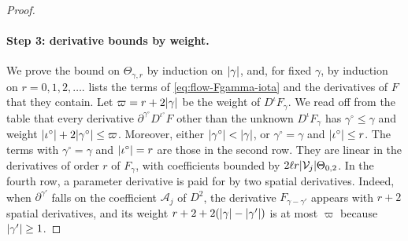 \begin{proof}
\paragraph{Step 3: derivative bounds by weight.} We prove the bound on
$\Theta_{\gamma,r}$ by induction on $\lvert \gamma\rvert$, and, for fixed $\gamma$, by
induction on $r=0,1,2,\dots$.  lists the terms of
\eqref{eq:flow-Fgamma-iota} and the derivatives of $F$ that they contain. Let
$\varpi=r+2\lvert \gamma\rvert$ be the weight of $D^\iota F_\gamma$. We read off from the
table that every derivative $\partial^{\gamma^\circ}D^{\iota^\circ}F$ other than
the unknown $D^\iota F_\gamma$ has $\gamma^\circ\le\gamma$ and weight
$\lvert \iota^\circ\rvert+2\lvert \gamma^\circ\rvert\le\varpi$. Moreover, either
$\lvert \gamma^\circ\rvert<\lvert \gamma\rvert$, or $\gamma^\circ=\gamma$ and $\lvert \iota^\circ\rvert\le r$.
The terms with $\gamma^\circ=\gamma$ and $\lvert \iota^\circ\rvert=r$ are those in the
second row. They are linear in the derivatives of order $r$ of $F_\gamma$, with
coefficients bounded by $2\ell r\lvert \mathcal V_j\rvert\Theta_{0,2}$. In the fourth
row, a parameter derivative is paid for by two spatial derivatives. Indeed, when
$\partial^{\gamma'}$ falls on the coefficient $\mathcal A_j$ of $D^2$, the
derivative $F_{\gamma-\gamma'}$ appears with $r+2$ spatial derivatives, and its
weight $r+2+2(\lvert \gamma\rvert-\lvert \gamma'\rvert)$ is at most $\varpi$ because
$\lvert \gamma'\rvert\ge1$.


\end{proof}
